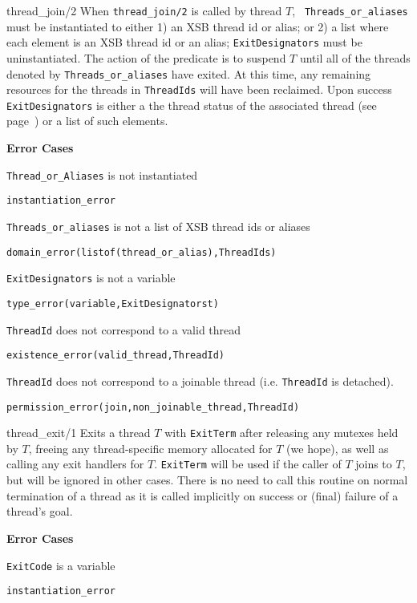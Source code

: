 \begin{description}
{thread\_join/2}
% 
When {\tt thread\_join/2} is called by thread $T$, {\tt
  Threads\_or\_aliases} must be instantiated to either 1) an XSB
thread id or alias; or 2) a list where each element is an XSB thread
id or an alias; {\tt ExitDesignators} must be uninstantiated.  The
action of the predicate is to suspend $T$ until all of the threads
denoted by {\tt Threads\_or\_aliases} have exited.  At this time, any
remaining resources for the threads in {\tt ThreadIds} will have been
reclaimed.  Upon success {\tt ExitDesignators} is either a the thread
status of the associated thread (see page~\pageref{page:thread-status}) 
or a list of such elements.  

{\bf Error Cases}
\bi
\item 	{\tt Thread\_or\_Aliases} is not instantiated
\bi
\item 	{\tt instantiation\_error}
\ei
%
\item 	{\tt Threads\_or\_aliases} is not a list of XSB thread ids or aliases
\bi
\item 	{\tt domain\_error(listof(thread\_or\_alias),ThreadIds)}
\ei
%
\item 	{\tt ExitDesignators} is not a variable
\bi
\item 	{\tt type\_error(variable,ExitDesignatorst)}
\ei
%
\item   {\tt ThreadId} does not correspond to a valid thread
\bi
\item   {\tt existence\_error(valid\_thread,ThreadId)}
\ei
\item   {\tt ThreadId} does not correspond to a joinable thread
  (i.e. {\tt ThreadId} is detached).
\bi
\item   {\tt permission\_error(join,non\_joinable\_thread,ThreadId)}
\ei
\ei


{thread\_exit/1}
%
Exits a thread $T$ with {\tt ExitTerm} after releasing any mutexes
held by $T$, freeing any thread-specific memory allocated for $T$ (we
hope), as well as calling any exit handlers for $T$.  {\tt ExitTerm}
will be used if the caller of $T$ joins to $T$, but will be ignored in
other cases.  There is no need to call this routine on normal
termination of a thread as it is called implicitly on success or
(final) failure of a thread's goal.

{\bf Error Cases}
\bi
\item 	{\tt ExitCode} is a variable
\bi
\item 	{\tt instantiation\_error}
\ei
\ei


\end{description}

